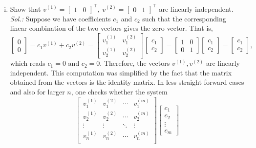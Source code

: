 \begin{example}
\label{expl:lin_indep}
\begin{enumerate}[(i)]
	\item Show that $v^{(1)} = \begin{bmatrix}
	1 & 0
	\end{bmatrix}^\top, \: v^{(2)} = \begin{bmatrix}
	0 & 1
	\end{bmatrix}^\top$ are linearly independent. \\
	{\it Sol.:}
	Suppose we have coefficients $c_1$ and $c_2$ such that the corresponding linear combination of the two vectors gives the zero vector. That is,
	\[ \begin{bmatrix}
	0 \\ 0
	\end{bmatrix} = c_1 v^{(1)} + c_2 v^{(2)} = \begin{bmatrix}
	v^{(1)}_1 & v^{(2)}_1 \\ v^{(1)}_2 & v^{(2)}_2
	\end{bmatrix} \begin{bmatrix} c_1 \\ c_2\end{bmatrix}
	= \begin{bmatrix} 1 & 0 \\ 0 & 1 \end{bmatrix} \begin{bmatrix} c_1 \\ c_2\end{bmatrix}
	= \begin{bmatrix}	c_1 \\ c_2 	\end{bmatrix}, \]
	which reads $c_1=0$ and $c_2=0$. Therefore, the vectors $v^{(1)},v^{(2)}$ are linearly independent. This computation was simplified by the fact that the matrix obtained from the vectors is the identity matrix. In less straight-forward cases and also for larger $n$, one checks whether the system
	\begin{equation}
	\label{eq:lin_dep_equ}
	 \begin{bmatrix}
	v^{(1)}_1 & v^{(2)}_1 & \cdots & v^{(m)}_1 \\
	v^{(1)}_2 & v^{(2)}_2 & \cdots & v^{(m)}_2 \\	 
	\vdots	& \vdots & \ddots & \vdots \\				
	v^{(1)}_n & v^{(2)}_n & \cdots & v^{(m)}_n \\	 
	\end{bmatrix} \begin{bmatrix} c_1 \\ c_2 \\ \vdots \\ c_m

\end{bmatrix}
\end{equation}
\end{enumerate}
\end{example}
